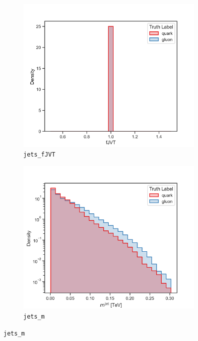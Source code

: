 \begin{figure}[!htb]
	\centering
	\begin{subfigure}[t]{0.48\textwidth}
		\includegraphics[width=1\textwidth]{src/plots/distributions/highlevel/jets_fJVT.png}
		\caption{\texttt{jets\_fJVT}}
		\label{fig:highlevel_24}
	\end{subfigure}
	\begin{subfigure}[t]{0.48\textwidth}
		\includegraphics[width=1\textwidth]{src/plots/distributions/highlevel/jets_m.png}
		\caption{\texttt{jets\_m}}
		\label{fig:highlevel_25}

\end{subfigure}
\end{figure}
